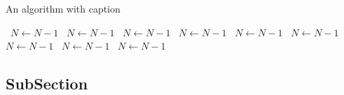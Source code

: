 \documentclass[a4paper]{article}
\begin{document}
\begin{algorithm}
\caption{An algorithm with caption}
\begin{algorithmic}
\    \State $N \gets N - 1$
\    \State $N \gets N - 1$
\    \State $N \gets N - 1$
\    \State $N \gets N - 1$
\    \State $N \gets N - 1$
\    \State $N \gets N - 1$
\    \State $N \gets N - 1$
\    \State $N \gets N - 1$
\    \State $N \gets N - 1$
\EndWhile
\end{algorithmic}
\end{algorithm}

\subsection{SubSection}
\end{document}
